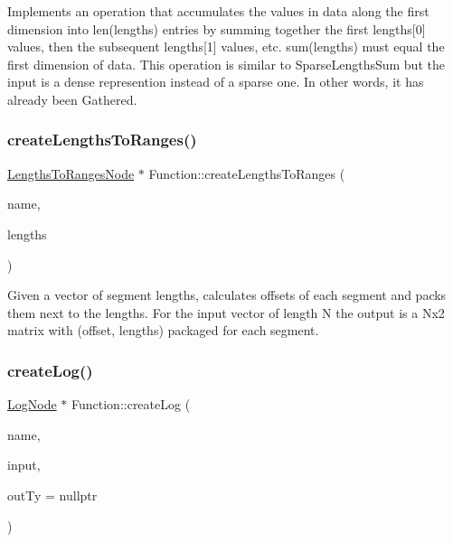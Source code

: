 Implements an operation that accumulates the values in {\ttfamily data} along the first dimension into len({\ttfamily lengths}) entries by summing together the first lengths\mbox{[}0\mbox{]} values, then the subsequent lengths\mbox{[}1\mbox{]} values, etc. sum({\ttfamily lengths}) must equal the first dimension of {\ttfamily data}. This operation is similar to Sparse\+Lengths\+Sum but the input is a dense represention instead of a sparse one. In other words, it has already been Gathered. \mbox{\label{classglow_1_1_function_a98924f81beee494322bc1cb8e7f5e5e7}} 
\subsubsection{\texorpdfstring{create\+Lengths\+To\+Ranges()}{createLengthsToRanges()}}
{\footnotesize\ttfamily \hyperlink{classglow_1_1_lengths_to_ranges_node}{Lengths\+To\+Ranges\+Node} $\ast$ Function\+::create\+Lengths\+To\+Ranges (\begin{DoxyParamCaption}\item[{llvm\+::\+String\+Ref}]{name,  }\item[{\hyperlink{structglow_1_1_node_value}{Node\+Value}}]{lengths }\end{DoxyParamCaption})}

Given a vector of segment lengths, calculates offsets of each segment and packs them next to the lengths. For the input vector of length N the output is a Nx2 matrix with (offset, lengths) packaged for each segment. \mbox{\label{classglow_1_1_function_a4fd96b3007929f8a2c534e72311cd6e8}} 
\subsubsection{\texorpdfstring{create\+Log()}{createLog()}}
{\footnotesize\ttfamily \hyperlink{classglow_1_1_log_node}{Log\+Node} $\ast$ Function\+::create\+Log (\begin{DoxyParamCaption}\item[{llvm\+::\+String\+Ref}]{name,  }\item[{\hyperlink{structglow_1_1_node_value}{Node\+Value}}]{input,  }\item[{\hyperlink{structglow_1_1_type}{Type\+Ref}}]{out\+Ty = {\ttfamily nullptr} }\end{DoxyParamCaption})}

